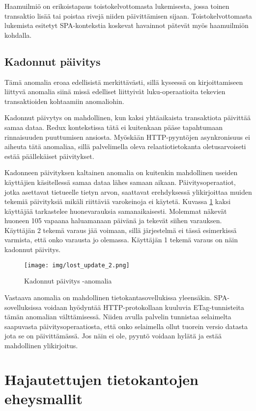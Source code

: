 \documentclass[finnish,twoside,censored,csm,sw-track-2018]{HYthesisML}
\begin{document}
Haamuilmiö on erikoistapaus toistokelvottomasta lukemisesta, jossa toinen transaktio lisää tai poistaa rivejä niiden päivittämisen sijaan. Toistokelvottomasta lukemista esitetyt SPA-kontekstia koskevat havainnot pätevät myös haamuilmiön kohdalla.

\subsection{Kadonnut päivitys}

Tämä anomalia eroaa edellisistä merkittävästi, sillä kyseessä on kirjoittamiseen liittyvä anomalia siinä missä edelliset liittyivät luku-operaatioita tekevien transaktioiden kohtaamiin anomaliohin.

Kadonnut päivytys on mahdollinen, kun kaksi yhtäaikaista transaktiota päivittää samaa dataa. Redux kontekstissa tätä ei kuitenkaan pääse tapahtumaan rinnaisuuden puuttumisen ansiosta. Myöskään HTTP-pyyntöjen asynkronisuus ei aiheuta tätä anomaliaa, sillä palvelimella oleva relaatiotietokanta oletusarvoiseti estää päällekäiset päivitykset.

Kadonneen päivityksen kaltainen anomalia on kuitenkin mahdollinen useiden käyttäjien käsitellessä samaa dataa lähes samaan aikaan. Päivitysoperaatiot, jotka asettavat tietueelle tietyn arvon, saattavat erehdyksessä ylikirjoittaa muiden tekemiä päivityksiä mikäli riittäviä varokeinoja ei käytetä. Kuvassa \ref{fig-lostupdate} kaksi käyttäjää tarkastelee huonevarauksia samanaikaisesti. Molemmat näkevät huoneen 105 vapaana haluamanaan päivänä ja tekevät siihen varauksen. Käyttäjän 2 tekemä varaus jää voimaan, sillä järjestelmä ei tässä esimerkissä varmista, että onko varausta jo olemassa. Käyttäjän 1 tekemä varaus on näin kadonnut päivitys.

\begin{figure}[ht]
  \centering
    \texttt{[image: img/lost\_update\_2.png]}
  \caption{Kadonnut päivitys -anomalia}
  \label{fig-lostupdate}
\end{figure}

Vastaava anomalia on mahdollinen tietokantasovellukissa yleensäkin. SPA-sovelluksissa voidaan hyödyntää HTTP-protokollaan kuuluvia ETag-tunnisteita tämän anomalian välttämisessä. Niiden avulla palvelin tunnistaa selaimelta saapuvasta päivitysoperaatiosta, että onko selaimella ollut tuorein versio datasta jota se on päivittämässä. Jos näin ei ole, pyyntö voidaan hylätä ja estää mahdollinen ylikirjoitus.

\section{Hajautettujen tietokantojen eheysmallit}
\end{document}
